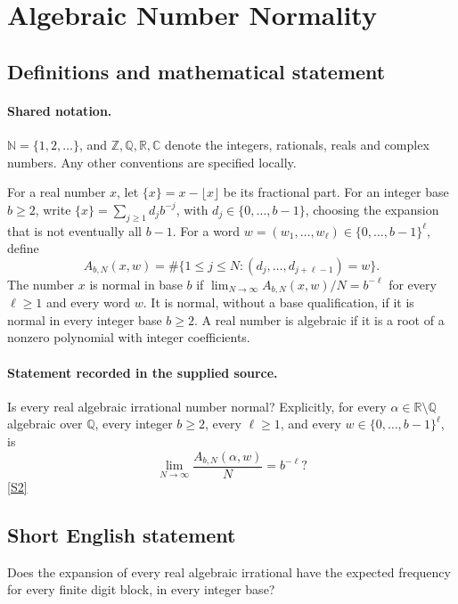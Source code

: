 \documentclass[11pt]{article}
\newcommand{\sref}[2]{\hyperlink{source:#1:#2}{[S#2]}}
\begin{document}
\section{Algebraic Number Normality}\label{statement}

\subsection{Definitions and mathematical statement}

\paragraph{Shared notation.}$\mathbb N=\{1,2,\ldots\}$, and $\mathbb Z,\mathbb Q,\mathbb R,\mathbb C$ denote the integers, rationals, reals and complex numbers. Any other conventions are specified locally.


For a real number \(x\), let \(\{x\}=x-\lfloor x\rfloor\)
be its fractional part. For an integer base \(b\ge2\), write
\(\{x\}=\sum_{j\ge1}d_jb^{-j}\), with
\(d_j\in\{0,\ldots,b-1\}\), choosing the expansion that is not
eventually all \(b-1\). For a word
\(w=(w_1,\ldots,w_\ell)\in\{0,\ldots,b-1\}^\ell\), define
\[
 A_{b,N}(x,w)=\#\{1\le j\le N:
       (d_j,\ldots,d_{j+\ell-1})=w\}.
\]
The number \(x\) is normal in base \(b\) if
\(\lim_{N\to\infty}A_{b,N}(x,w)/N=b^{-\ell}\) for every
\(\ell\ge1\) and every word \(w\). It is normal, without a base
qualification, if it is normal in every integer base \(b\ge2\).
A real number is algebraic if it is a root of a nonzero polynomial
with integer coefficients.
\paragraph{Statement recorded in the supplied source.}
Is every real algebraic irrational number normal? Explicitly,
for every \(\alpha\in\mathbb R\setminus\mathbb Q\) algebraic over
\(\mathbb Q\), every integer \(b\ge2\), every \(\ell\ge1\), and every
\(w\in\{0,\ldots,b-1\}^\ell\), is
\[
                \lim_{N\to\infty}\frac{A_{b,N}(\alpha,w)}N=b^{-\ell}?
\] \sref{statement}{2}
\subsection{Short English statement}
Does the expansion of every real algebraic irrational have the expected frequency for every finite digit block, in every integer base?
\end{document}
